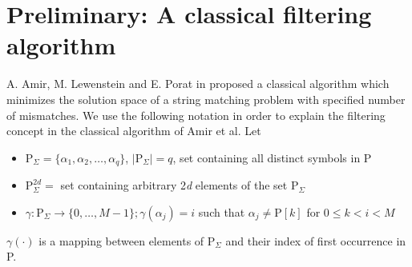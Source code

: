 \section{Preliminary: A classical filtering algorithm}\label{subsec:filtering-phase-preliminaries}
A. Amir, M. Lewenstein and E. Porat in \cite{Amir2004} proposed a classical algorithm which minimizes the solution space of a string matching problem with specified number of mismatches. We use the following notation in order to explain the filtering concept in the classical algorithm of Amir et al. Let 
\begin{itemize}
	\item $\text{P}_{\Sigma} = \{\alpha_1,\alpha_2, \ldots, \alpha_{q}\}$, $\vert \mathrm{P}_{\Sigma} \vert = q$, set containing all distinct symbols in P
	\item $\text{P}_{\Sigma}^{2d} = $ set containing arbitrary 2\textit{d} elements of the set $\text{P}_{\Sigma}$
	\item $\gamma: \text{P}_{\Sigma} \rightarrow \{0,\ldots,M-1\}; \gamma(\alpha_{j}) = i$ such that $\alpha_{j} \neq \text{P}[k]$ for $0 \leq k < i < M$
\end{itemize}
$\gamma(\cdot)$ is a mapping between elements of $\text{P}_{\Sigma}$ and their index of first occurrence in P.

